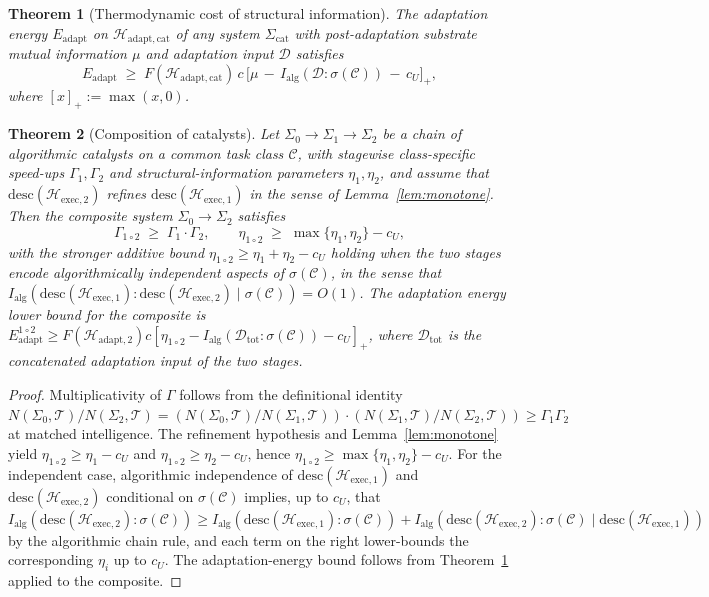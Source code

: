 \documentclass[10pt,a4paper]{amsart}
\newtheorem{theorem}{Theorem}
\newcommand{\Class}{\mathcal{C}}
\newcommand{\Eadapt}{E_{\mathrm{adapt}}}
\newcommand{\Erasure}{c}
\newcommand{\Fover}{F}
\newcommand{\Hw}{\mathcal{H}}
\newcommand{\MutInfo}{I_{\mathrm{alg}}}
\newcommand{\Nop}{N}
\newcommand{\Sys}{\Sigma}
\newcommand{\Task}{\mathcal{T}}
\newcommand{\descop}{\mathrm{desc}}
\begin{document}
\begin{theorem}[Thermodynamic cost of structural information]
\label{thm:adaptation-cost}
The adaptation energy $\Eadapt$ on $\Hw_{\mathrm{adapt,cat}}$ of any system
$\Sys_{\mathrm{cat}}$ with post-adaptation substrate mutual
information $\mu$ and adaptation input $\mathcal{D}$ satisfies
\begin{equation}
\label{eq:adaptation-floor}
\Eadapt\;\ge\;
\Fover(\Hw_{\mathrm{adapt,cat}})\,\Erasure\,
\bigl[\mu\,-\,\MutInfo(\mathcal{D}:\sigma(\Class))\,-\,c_U\bigr]_+,
\end{equation}
where $[x]_+:=\max(x,0)$.
\end{theorem}

\begin{theorem}[Composition of catalysts]
\label{thm:composition}
Let $\Sys_0\to\Sys_1\to\Sys_2$ be a chain of algorithmic catalysts
on a common task class $\Class$, with stagewise class-specific
speed-ups $\Gamma_1,\Gamma_2$ and structural-information parameters
$\eta_1,\eta_2$, and assume that $\descop(\Hw_{\mathrm{exec},2})$
refines $\descop(\Hw_{\mathrm{exec},1})$ in the sense of
Lemma~\ref{lem:monotone}. Then the composite system
$\Sys_0\to\Sys_2$ satisfies
\begin{equation}
\label{eq:composition}
\Gamma_{1\circ 2}\;\ge\;\Gamma_1\cdot\Gamma_2,
\qquad
\eta_{1\circ 2}\;\ge\;\max\{\eta_1,\eta_2\}-c_U,
\end{equation}
with the stronger additive bound
$\eta_{1\circ 2}\ge\eta_1+\eta_2-c_U$ holding when the two stages
encode algorithmically independent aspects of $\sigma(\Class)$, in
the sense that $\MutInfo(\descop(\Hw_{\mathrm{exec},1}):
\descop(\Hw_{\mathrm{exec},2})\mid\sigma(\Class))=O(1)$. The
adaptation energy lower bound for the composite is
$\Eadapt^{1\circ 2}\ge\Fover(\Hw_{\mathrm{adapt},2})\Erasure
[\eta_{1\circ 2}-\MutInfo(\mathcal{D}_{\mathrm{tot}}:\sigma(\Class))
-c_U]_+$, where $\mathcal{D}_{\mathrm{tot}}$ is the concatenated
adaptation input of the two stages.
\end{theorem}

\begin{proof}
Multiplicativity of $\Gamma$ follows from the definitional
identity
$\Nop(\Sys_0,\Task)/\Nop(\Sys_2,\Task)
=(\Nop(\Sys_0,\Task)/\Nop(\Sys_1,\Task))\cdot
(\Nop(\Sys_1,\Task)/\Nop(\Sys_2,\Task))\ge\Gamma_1\Gamma_2$ at
matched intelligence. The refinement hypothesis and
Lemma~\ref{lem:monotone} yield $\eta_{1\circ 2}\ge\eta_1-c_U$ and
$\eta_{1\circ 2}\ge\eta_2-c_U$, hence
$\eta_{1\circ 2}\ge\max\{\eta_1,\eta_2\}-c_U$. For the independent
case, algorithmic independence of
$\descop(\Hw_{\mathrm{exec},1})$ and $\descop(\Hw_{\mathrm{exec},2})$
conditional on $\sigma(\Class)$ implies, up to $c_U$, that
$\MutInfo(\descop(\Hw_{\mathrm{exec},2}):\sigma(\Class))\ge
\MutInfo(\descop(\Hw_{\mathrm{exec},1}):\sigma(\Class))
+\MutInfo(\descop(\Hw_{\mathrm{exec},2}):\sigma(\Class)\mid
\descop(\Hw_{\mathrm{exec},1}))$ by the algorithmic chain rule,
and each term on the right lower-bounds the corresponding
$\eta_i$ up to $c_U$. The adaptation-energy bound follows from
Theorem~\ref{thm:adaptation-cost} applied to the composite.
\end{proof}
\end{document}
